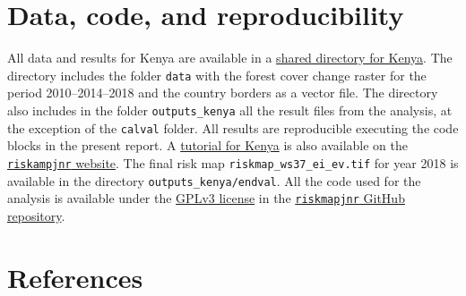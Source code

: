 \documentclass[paper=a4, 12pt, DIV=12]{scrartcl}
\begin{document}
\section{Data, code, and reproducibility}
\label{sec:org9e8a90b}

All data and results for Kenya are available in a \href{https://drive.google.com/drive/folders/1ZMt2NMCXM0-UFjn7DKIw4av9mxysxVXl?usp=share\_link}{shared directory for Kenya}. The directory includes the folder \texttt{data} with the forest cover change raster for the period 2010--2014--2018 and the country borders as a vector file. The directory also includes in the folder \texttt{outputs\_kenya} all the result files from the analysis, at the exception of the \texttt{calval} folder. All results are reproducible executing the code blocks in the present report. A \href{file:///home/ghislain/Code/riskmapjnr/docs/notebooks/kenya.html}{tutorial for Kenya} is also available on the \href{https://ecology.ghislainv.fr/riskmapjnr}{\texttt{riskampjnr} website}. The final risk map \texttt{riskmap\_ws37\_ei\_ev.tif} for year 2018 is available in the directory \texttt{outputs\_kenya/endval}. All the code used for the analysis is available under the \href{https://ecology.ghislainv.fr/riskmapjnr/license.html}{GPLv3 license} in the \href{https://github.com/ghislainv/riskmapjnr}{\texttt{riskmapjnr} GitHub repository}.

\newpage

\section{References}
\label{sec:org66b13c4}
\end{document}
